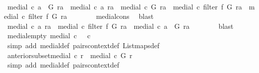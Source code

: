 \begin{isabellebody}
\ \isamarkupfalse%
\ {\isachardoublequoteopen}medial\ c\ {\isacharparenleft}a\ {\isacharhash}\ G{\isacharparenright}\ ra\ {\isacharequal}\ medial\ c\ {\isacharbrackleft}a{\isacharbrackright}\ ra\ {\isacharbar}{\isasymunion}{\isacharbar}\ {\isacharparenleft}medial\ c\ G\ ra\ {\isacharbar}{\isasymunion}{\isacharbar}\ medial\ c\ {\isacharparenleft}filter\ f\ G{\isacharparenright}\ ra\ {\isacharbar}{\isasymunion}{\isacharbar}\ medial\ c\ {\isacharparenleft}filter\ f\ G{\isacharparenright}\ ra{\isacharparenright}{\isachardoublequoteclose}\isanewline
\ \ \ \ \ \ \isamarkupfalse%
\ medial{\isacharunderscore}cons\ \isamarkupfalse%
\ blast\isanewline
\ \ \ \ \isamarkupfalse%
\ \isamarkupfalse%
\ {\isachardoublequoteopen}medial\ c\ {\isacharbrackleft}a{\isacharbrackright}\ ra\ {\isacharbar}{\isasymunion}{\isacharbar}\ medial\ c\ {\isacharparenleft}filter\ f\ G{\isacharparenright}\ ra\ {\isacharbar}{\isasymsubseteq}{\isacharbar}\ medial\ c\ {\isacharparenleft}a\ {\isacharhash}\ G{\isacharparenright}\ ra{\isachardoublequoteclose}\isanewline
\ \ \ \ \ \ \isamarkupfalse%
\ blast\isanewline
\ \ \isamarkupfalse%
\isanewline
{}\isamarkupfalse%
%
\endisatagproof
{\isafoldproof}%
%
\isadelimproof
\isanewline
%
\endisadelimproof
\isanewline
{}\isamarkupfalse%
\ medial{\isacharunderscore}empty{\isacharcolon}\ {\isachardoublequoteopen}medial\ c\ {\isacharbrackleft}{\isacharbrackright}\ {\isacharequal}\ c{\isachardoublequoteclose}\isanewline
%
\isadelimproof
\ \ %
\endisadelimproof
%
\isatagproof
{}\isamarkupfalse%
\ {\isacharparenleft}simp\ add{\isacharcolon}\ medial{\isacharunderscore}def\ pairs{}context{\isacharunderscore}def\ List{\isachardot}maps{\isacharunderscore}def{\isacharparenright}%
\endisatagproof
{\isafoldproof}%
%
\isadelimproof
\isanewline
%
\endisadelimproof
\isanewline
{}\isamarkupfalse%
\ anterior{\isacharunderscore}subset{\isacharunderscore}medial{\isacharcolon}\ {\isachardoublequoteopen}c\ r\ {\isacharbar}{\isasymsubseteq}{\isacharbar}\ {\isacharparenleft}medial\ c\ G\ r{\isacharparenright}{\isachardoublequoteclose}\isanewline
%
\isadelimproof
\ \ \ \ %
\endisadelimproof
%
\isatagproof
{}\isamarkupfalse%
\ {\isacharparenleft}simp\ add{\isacharcolon}\ medial{\isacharunderscore}def\ pairs{}context{\isacharunderscore}def{\isacharparenright}%
\endisatagproof
{\isafoldproof}%
%
\isadelimproof
\isanewline
%
\endisadelimproof
\isanewline
{}\isamarkupfalse%

\end{isabellebody}
